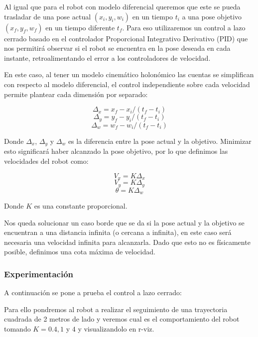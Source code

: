 Al igual que para el robot con modelo diferencial queremos que este se pueda trasladar de una pose actual $(x_i,y_i,w_i)$ en un tiempo $t_i$ a una pose objetivo $(x_f,y_f,w_f)$ en un tiempo diferente $t_f$. Para eso utilizaremos un control a lazo cerrado basado en el controlador Proporcional Integrativo Derivativo (PID) que nos permitirá observar si el robot se encuentra en la pose deseada en cada instante, retroalimentando el error a los controladores de velocidad.

En este caso, al tener un modelo cinemático holonómico las cuentas se simplifican con respecto al modelo diferencial, el control independiente sobre cada velocidad permite plantear cada  dimensión por separado:

$$\Delta_x = x_f - x_i / (t_f - t_i)$$
$$\Delta_y = y_f - y_i / (t_f - t_i)$$
$$\Delta_w = w_f - w_i / (t_f - t_i)$$

Donde $\Delta_x$, $\Delta_y$ y $\Delta_w$ es la diferencia entre la pose actual y la objetivo. Minimizar esto significará haber alcanzado la pose objetivo, por lo que definimos las velocidades del robot como:

$$V_x = K \Delta_x $$
$$V_y = K \Delta_y $$
$$\theta = K \Delta_w $$

Donde $K$ es una constante proporcional.


Nos queda solucionar un caso borde que se da si la pose actual y la objetivo se encuentran a una distancia infinita (o cercana a infinita), en este caso será necesaria una velocidad infinita para alcanzarla. Dado que esto no es físicamente posible, definimos una cota máxima de velocidad.


\subsubsection{Experimentación}

A continuación se pone a prueba el control a lazo cerrado:

Para ello pondremos al robot a realizar el seguimiento de una trayectoria cuadrada de 2 metros de lado y veremos cual es el comportamiento del robot tomando $K=0.4,1$ y $4$ y visualizandolo en r-viz.

